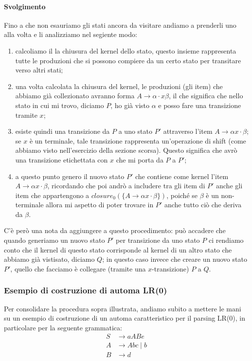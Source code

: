 \documentclass[class=book, crop=false, oneside, 12pt]{standalone}
\begin{document}
\paragraph{Svolgimento}
Fino a che non esauriamo gli stati ancora da visitare andiamo a prenderli uno alla volta e li analizziamo nel segiente modo:
\begin{enumerate}
    \item calcoliamo il la chiusura del kernel dello stato, questo insieme rappresenta tutte le produzioni che si possono compiere da un certo stato per transitare verso altri stati;
    \item una volta calcolata la chiusura del kernel, le produzioni (gli item) che abbiamo già collezionato avranno forma \(A \to \alpha \cdot x \beta\), il che significa che nello stato in cui mi trovo, diciamo \(P\), ho già visto \(\alpha\) e posso fare una transizione tramite \(x\);
    \item esiste quindi una transizione da \(P\) a uno stato \(P'\) attraverso l'item \(A \to \alpha x \cdot \beta\); se \(x\) è un terminale, tale transizione rappresenta un'operazione di shift (come abbiamo visto nell'esercizio della sezione scorsa). Questo significa che avrò una transizione etichettata con \(x\) che mi porta da \(P\) a \(P'\);
    \item a questo punto genero il nuovo stato \(P'\) che contiene come kernel l'item \(A \to \alpha x \cdot \beta\), ricordando che poi andrò a includere tra gli item di \(P'\) anche gli item che appartengono a \(closure_0 (\{ A \to \alpha x \cdot \beta \})\), poiché se \(\beta\) è un non-terminale allora mi aspetto di poter trovare in \(P'\) anche tutto ciò che deriva da \(\beta\).
\end{enumerate}
C'è però una nota da aggiungere a questo procedimento: può accadere che quando generiamo un nuovo stato \(P'\) per transizione da uno stato \(P\) ci rendiamo conto che il kernel di questo stato corrisponde al kernel di un altro stato che abbiamo già vistisato, diciamo \(Q\); in questo caso invece che creare un nuovo stato \(P'\), quello che facciamo è collegare (tramite una \(x\)-transizione) \(P\) a \(Q\).

\subsubsection{Esempio di costruzione di automa LR(0)}
\label{subsubsec:esercizio_costruzione_automa_lr0}
Per consolidare la procedura sopra illustrata, andiamo subito a mettere le mani su un esempio di costruzione di un automa caratteristico per il parsing LR(0), in particolare per la seguente grammatica:
\begin{align*}
    S &\to aABe \\
    A &\to Abc \mid b \\
    B &\to d
\end{align*}
\end{document}
